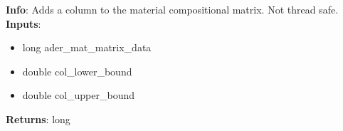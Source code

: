 \textbf{Info}: Adds a column to the material compositional matrix. Not thread
safe. \\

\noindent \textbf{Inputs}:
\begin{itemize}
\item{long ader\_mat\_matrix\_data}
\item{double col\_lower\_bound}
\item{double col\_upper\_bound}
\end{itemize}

\noindent \textbf{Returns}: long
